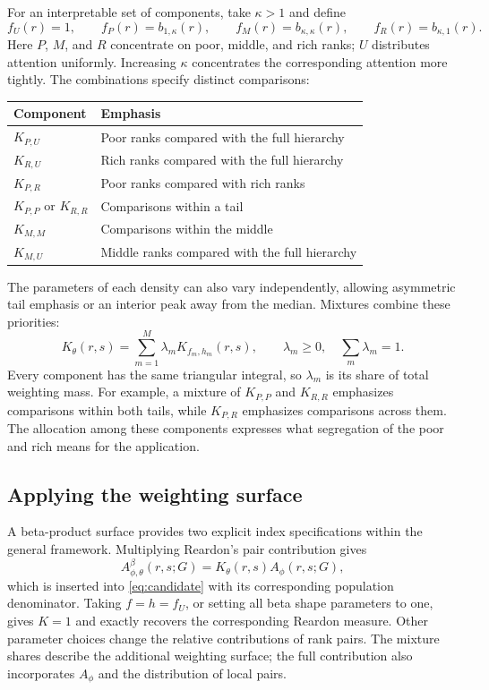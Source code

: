 \documentclass[11pt]{article}
\begin{document}
For an interpretable set of components, take $\kappa>1$ and define
\[
f_U(r)=1,\qquad
f_P(r)=b_{1,\kappa}(r),\qquad
f_M(r)=b_{\kappa,\kappa}(r),\qquad
f_R(r)=b_{\kappa,1}(r).
\]
Here $P$, $M$, and $R$ concentrate on poor, middle, and rich ranks; $U$ distributes attention uniformly. Increasing $\kappa$ concentrates the corresponding attention more tightly. The combinations specify distinct comparisons:
\begin{center}
\begin{tabular}{ll}
\toprule
Component & Emphasis\\
\midrule
$K_{P,U}$ & Poor ranks compared with the full hierarchy\\
$K_{R,U}$ & Rich ranks compared with the full hierarchy\\
$K_{P,R}$ & Poor ranks compared with rich ranks\\
$K_{P,P}$ or $K_{R,R}$ & Comparisons within a tail\\
$K_{M,M}$ & Comparisons within the middle\\
$K_{M,U}$ & Middle ranks compared with the full hierarchy\\
\bottomrule
\end{tabular}
\end{center}
The parameters of each density can also vary independently, allowing asymmetric tail emphasis or an interior peak away from the median. Mixtures combine these priorities:
\begin{equation}
K_\theta(r,s)=\sum_{m=1}^{M}\lambda_m K_{f_m,h_m}(r,s),
\qquad \lambda_m\geq0,\quad \sum_m\lambda_m=1.
\label{eq:beta-mixture}
\end{equation}
Every component has the same triangular integral, so $\lambda_m$ is its share of total weighting mass. For example, a mixture of $K_{P,P}$ and $K_{R,R}$ emphasizes comparisons within both tails, while $K_{P,R}$ emphasizes comparisons across them. The allocation among these components expresses what segregation of the poor and rich means for the application.

\subsection{Applying the weighting surface}

A beta-product surface provides two explicit index specifications within the general framework. Multiplying Reardon's pair contribution gives
\begin{equation}
A^{\beta}_{\phi,\theta}(r,s;G)=K_\theta(r,s)A_\phi(r,s;G),
\label{eq:beta-A}
\end{equation}
which is inserted into \eqref{eq:candidate} with its corresponding population denominator. Taking $f=h=f_U$, or setting all beta shape parameters to one, gives $K=1$ and exactly recovers the corresponding Reardon measure. Other parameter choices change the relative contributions of rank pairs. The mixture shares describe the additional weighting surface; the full contribution also incorporates $A_\phi$ and the distribution of local pairs.
\end{document}
